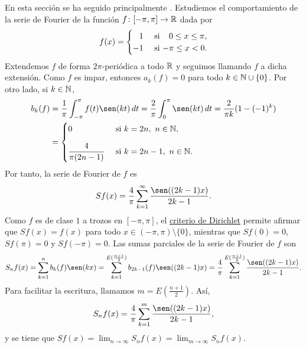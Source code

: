 \documentclass[a4paper, 12pt, oneside]{book}
\begin{document}
En esta sección se ha seguido principalmente \cite{duoandikoetxea2}. Estudiemos el comportamiento de la serie de Fourier de la función $f \colon [-\pi,\pi]\to\mathbb R$ dada por
\[f(x) = \begin{cases}
    \phantom{-}1 & $ si $ \phantom{-}0 \leq x \leq \pi, \\
    -1 & $ si $ -\pi \leq x < 0.
\end{cases}\]
Extendemos $f$ de forma $2\pi$-periódica a todo $\mathbb R$ y seguimos llamando $f$ a dicha extensión. Como $f$ es impar, entonces $a_k(f) = 0$ para todo $k \in \mathbb N \cup \{0\}$. Por otro lado, si $k \in \mathbb N$,
\begin{align*}
    b_k(f) &= \frac{1}{\pi}\integral{-\pi}{\pi}{f(t)\sen(kt)} = \frac{2}{\pi}\integral{0}{\pi}{\sen(kt)} = \frac{2}{\pi k}(1-(-1)^k) \\
    &= \begin{cases}
        0 & $ si $ k = 2n, \ n \in \N, \\[10pt]
        \displaystyle \frac{4}{\pi (2n-1)} & $ si $ k = 2n-1, \ n \in \N.
    \end{cases}
\end{align*}
Por tanto, la serie de Fourier de $f$ es
\[Sf(x) = \frac{4}{\pi}\sum_{k=1}^\infty \frac{\sen((2k-1)x)}{2k-1}.\]
Como $f$ es de clase $1$ a trozos en $[-\pi,\pi]$, el \hyperref[1.2.11]{\color{blue}criterio de Dirichlet} permite afirmar que $Sf(x) = f(x)$ para todo $x \in (-\pi,\pi) \setminus \{0\}$, mientras que $Sf(0) = 0$, $Sf(\pi) = 0$ y $Sf(-\pi) = 0$.
Las sumas parciales de la serie de Fourier de $f$ son
\[S_nf(x) = \sum_{k=1}^n b_k(f)\sen(kx) = \sum_{k=1}^{E(\frac{n+1}{2})}b_{2k-1}(f)\sen((2k-1)x) = \frac{4}{\pi}\sum_{k=1}^{E(\frac{n+1}{2})}\frac{\sen((2k-1)x)}{2k-1}.\]
Para facilitar la escritura, llamamos $m = E(\frac{n+1}{2})$. Así,
\[S_nf(x) = \frac{4}{\pi}\sum_{k=1}^m\frac{\sen((2k-1)x)}{2k-1},\]
y se tiene que $Sf(x) = \lim_{n\to\infty} S_nf(x) = \lim_{m\to\infty} S_nf(x)$.
\end{document}
